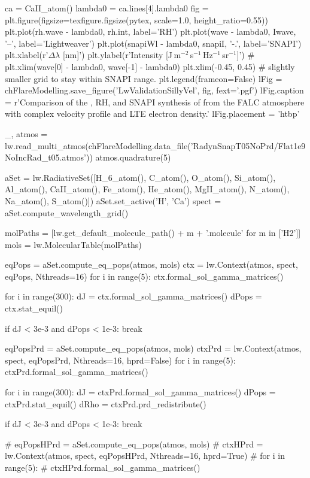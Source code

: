 \begin{pycode}[FlareModelling]
ca = CaII_atom()
lambda0 = ca.lines[4].lambda0
fig = plt.figure(figsize=texfigure.figsize(pytex, scale=1.0, height_ratio=0.55))
plt.plot(rh.wave - lambda0, rh.int, label='RH')
plt.plot(wave - lambda0, Iwave, '--', label='Lightweaver')
plt.plot(snapiWl - lambda0, snapiI, '-.', label='SNAPI')
plt.xlabel(r'$\Delta\lambda$ [nm]')
plt.ylabel(r'Intensity [J\,m$^{-2}$\,s$^{-1}$\,Hz$^{-1}$\,sr$^{-1}$]')
# plt.xlim(wave[0] - lambda0, wave[-1] - lambda0)
plt.xlim(-0.45, 0.45) # slightly smaller grid to stay within SNAPI range.
plt.legend(frameon=False)
lFig = chFlareModelling.save_figure('LwValidationSillyVel', fig, fext='.pgf')
lFig.caption = r'Comparison of the \Lw{}, RH, and SNAPI synthesis of \CaLine{} from the FALC atmosphere with complex velocity profile and LTE electron density.'
lFig.placement = 'htbp'
\end{pycode}
\begin{pycode}[FlareModelling]

_, atmos = lw.read_multi_atmos(chFlareModelling.data_file('RadynSnapT05NoPrd/Flat1e9NoIncRad_t05.atmos'))
atmos.quadrature(5)

aSet = lw.RadiativeSet([H_6_atom(), C_atom(), O_atom(), Si_atom(), Al_atom(),
                        CaII_atom(), Fe_atom(), He_atom(), MgII_atom(), N_atom(),
                        Na_atom(), S_atom()])
aSet.set_active('H', 'Ca')
spect = aSet.compute_wavelength_grid()

molPaths = [lw.get_default_molecule_path() + m + '.molecule' for m in ['H2']]
mols = lw.MolecularTable(molPaths)

eqPops = aSet.compute_eq_pops(atmos, mols)
ctx = lw.Context(atmos, spect, eqPops, Nthreads=16)
for i in range(5):
    ctx.formal_sol_gamma_matrices()

for i in range(300):
    dJ = ctx.formal_sol_gamma_matrices()
    dPops = ctx.stat_equil()

    if dJ < 3e-3 and dPops < 1e-3:
        break

eqPopsPrd = aSet.compute_eq_pops(atmos, mols)
ctxPrd = lw.Context(atmos, spect, eqPopsPrd, Nthreads=16, hprd=False)
for i in range(5):
    ctxPrd.formal_sol_gamma_matrices()

for i in range(300):
    dJ = ctxPrd.formal_sol_gamma_matrices()
    dPops = ctxPrd.stat_equil()
    dRho = ctxPrd.prd_redistribute()

    if dJ < 3e-3 and dPops < 1e-3:
        break

# eqPopsHPrd = aSet.compute_eq_pops(atmos, mols)
# ctxHPrd = lw.Context(atmos, spect, eqPopsHPrd, Nthreads=16, hprd=True)
# for i in range(5):
#     ctxHPrd.formal_sol_gamma_matrices()


\end{pycode}
